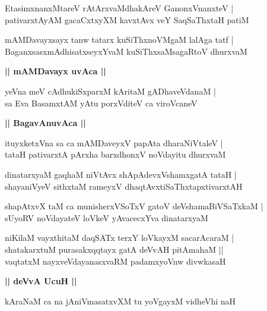 \documentclass[twoside,12pt,openright]{book}
\newcounter{shloka}[chapter]
\def\uvaca#1{\centerline{{\large\textbf{#1}}}}
\begin{document}
\begin{shloka}%
EtasimxnanxMtareV rAtArxvaMdhakAreV GanonxVnanxteV |\\
pativarxtAyAM gacaCxtxyXM  kavxtAvx veY SaqSaThxtaH patiM 
\end{shloka}

\begin{shloka}%
mAMDavayxsayx tanw tatarx kuSiThxnoVMgaM lalAga tatf |\\
BaganxsasxmAdhisatxseyxYvaM kuSiThxsaMsagaRtoV dhurxvaM 
\end{shloka}

\uvaca{|| mAMDavayx uvAca ||}

\begin{shloka}%
yeVna meV cAdhukiSxparxM kAritaM gADhaveVdanaM |\\
sa Eva BasamxtAM yAtu porxVditeV ca viroVcaneV 
\end{shloka}

\uvaca{|| BagavAnuvAca ||}

\begin{shloka}%
ituyxketxVna sa ca mAMDaveyxV papAta dharaNiVtaleV |\\
tataH pativarxtA pArxha barxdhonxV noVdayitu dhurxvaM 
\end{shloka}

\begin{shloka}%
dinatarxyaM gaqhaM niVtAvx shApAdevxVshamxgatA tataH |\\
shayaniVyeV sithxtaM rameyxV dhaqtAvxtiSaThxtapxtivarxtAH 
\end{shloka}

\begin{shloka}%
shapAtxvX taM ca munisherxVSoTxV gatoV deVshamaBiVSaTxkaM |\\
sUyoRV noVdayateV loVkeV yAvacecxYva dinatarxyaM 
\end{shloka}

\begin{shloka}%
niKilaM vayxthitaM daqSATx terxY loVkayxM sacarAcaraM |\\
shatakarxtuM purasakxqqtayx gatA deVvAH pitAmahaM ||\\
vaqtatxM nayxveVdayanasxvaRM padamxyoVnw divwkasaH 
\end{shloka}

\uvaca{|| deVvA UcuH ||}

\begin{shloka}%
kAraNaM ca na jAniVmasatxvXM tu yoVgayxM vidheVhi naH 
\end{shloka}
\end{document}
